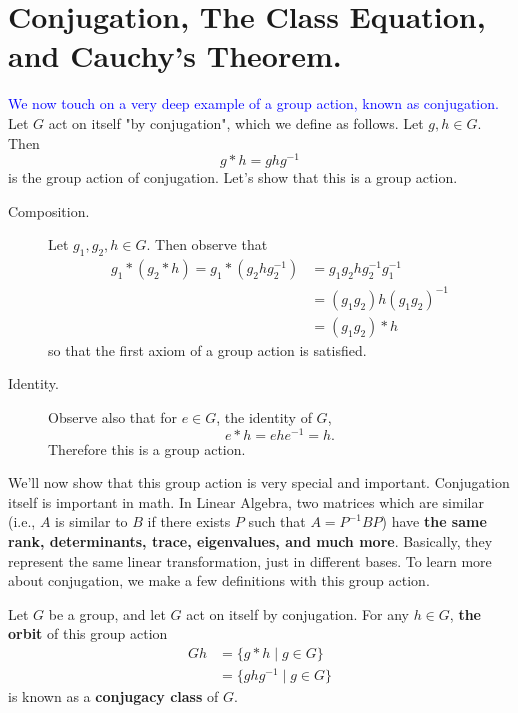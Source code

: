     \newpage
    \section{Conjugation, The Class Equation, and Cauchy's Theorem.}
    \textcolor{blue}{We now touch on a very deep example of a group action, known as
    conjugation.} Let $G$ act on itself "by conjugation", which we define
    as follows. Let $g, h \in G$. Then 
    \[
        g * h = ghg^{-1}
    \]
    is the group action of conjugation.
    Let's show that this is a group action. 
    \begin{description}
        \item[Composition.] Let $g_1, g_2, h \in G$. Then observe that
        \begin{align*}
            g_1 * (g_2 * h) = g_1 * (g_2hg_2^{-1}) &= g_1g_2 h g_2^{-1}g_1^{-1} \\
            & = (g_1g_2) h (g_1g_2)^{-1} \\
            & = (g_1g_2) * h
        \end{align*}
        so that the first axiom of a group action is satisfied.
        \item[Identity.]
        Observe also that for $e \in G$, the identity of $G$, 
        \[
            e * h = ehe^{-1} = h.
        \]
        Therefore this is a group action.
    \end{description}

    We'll now show that this group action is very special and
    important. Conjugation itself is important in math. In Linear
    Algebra, two matrices which are similar (i.e., $A$ is similar to
    $B$ if there exists $P$ such that $A = P^{-1}BP$) have \textbf{the same 
    rank, determinants, trace, eigenvalues, and much more}. Basically,
    they represent the same linear transformation, just in different
    bases. To learn more about conjugation, we make a few definitions
    with this group action.

    \begin{definition}
        Let $G$ be a group, and let $G$ act on itself by conjugation.
        For any $h \in G$, \textbf{the orbit} of this group action
        \begin{align*}
            Gh & = \{g * h \mid g \in G\} \\
            & = \{ghg^{-1} \mid g \in G\}
        \end{align*}
        is known as a \textbf{conjugacy class} of $G$.
    \end{definition}


